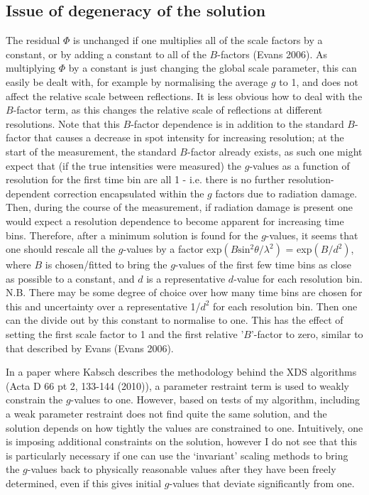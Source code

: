 \documentclass[11pt, oneside]{article}   	%
\begin{document}
\subsection{Issue of degeneracy of the solution}
The residual $\Phi$ is unchanged if one multiplies all of the scale factors by a constant, or by adding a constant to all of the $B$-factors (Evans 2006). As multiplying $\Phi$ by a constant is just changing the global scale parameter, this can easily be dealt with, for example by normalising the average $g$ to 1, and does not affect the relative scale between reflections. It is less obvious how to deal with the $B$-factor term, as this changes the relative scale of reflections at different resolutions. 
Note that this $B$-factor dependence is in addition to the standard $B$-factor that causes a decrease in spot intensity for increasing resolution; at the start of the measurement, the standard $B$-factor already exists, as such one might expect that (if the true intensities were measured) the $g$-values as a function of resolution for the first time bin are all 1 - i.e. there is no further resolution-dependent correction encapsulated within the $g$ factors due to radiation damage. Then, during the course of the measurement, if radiation damage is present one would expect a resolution dependence to become apparent for increasing time bins. 
Therefore, after a minimum solution is found for the $g$-values, it seems that one should rescale all the $g$-values by a factor exp$(B\text{sin}^2\theta/\lambda^2)$ = exp$(B/d^2)$, where $B$ is chosen/fitted to bring the $g$-values of the first few time bins as close as possible to a constant, and $d$ is a representative $d$-value for each resolution bin. {\color{red} N.B. There may be some degree of choice over how many time bins are chosen for this and uncertainty over a representative 1/$d^2$ for each resolution bin.} 
Then one can the divide out by this constant to normalise to one. This has the effect of setting the first scale factor to 1 and the first relative '$B$'-factor to zero, similar to that described by Evans (Evans 2006). 

In a paper where Kabsch describes the methodology behind the XDS algorithms (Acta D 66 pt 2, 133-144 (2010)), a parameter restraint term is used to weakly constrain the $g$-values to one. However, based on tests of my algorithm, including a weak parameter restraint does not find quite the same solution, and the solution depends on how tightly the values are constrained to one. Intuitively, one is imposing additional constraints on the solution, however I do not see that this is particularly necessary if one can use the `invariant' scaling methods to bring the $g$-values back to physically reasonable values after they have been freely determined, even if this gives initial $g$-values that deviate significantly from one.
\end{document}
